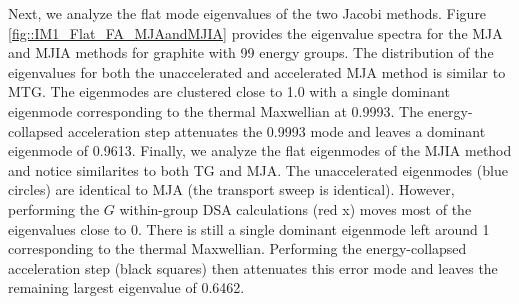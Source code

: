 Next, we analyze the flat mode eigenvalues of the two Jacobi methods. Figure \ref{fig::IM1_Flat_FA_MJAandMJIA} provides the eigenvalue spectra for the MJA and MJIA methods for graphite with 99 energy groups. The distribution of the eigenvalues for both the unaccelerated and accelerated MJA method is similar to MTG. The eigenmodes are clustered close to 1.0 with a single dominant eigenmode corresponding to the thermal Maxwellian at 0.9993. The energy-collapsed acceleration step attenuates the 0.9993 mode and leaves a dominant eigenmode of 0.9613. Finally, we analyze the flat eigenmodes of the MJIA method and notice similarites to both TG and MJA. The unaccelerated eigenmodes (blue circles) are identical to MJA (the transport sweep is identical). However, performing the $G$ within-group DSA calculations (red x) moves most of the eigenvalues close to 0. There is still a single dominant eigenmode left around 1 corresponding to the thermal Maxwellian. Performing the energy-collapsed acceleration step (black squares) then attenuates this error mode and leaves the remaining largest eigenvalue of 0.6462.

